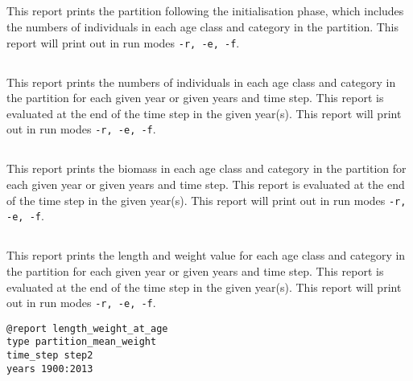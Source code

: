 \subsection{}\label{sec:Report-InitialisationPartition}

This report prints the partition following the initialisation phase, which includes the numbers of individuals in each age class and category in the partition. This report will print out in run modes \texttt{-r, -e, -f}.

\subsection{}\label{sec:Report-Partition}

This report prints the numbers of individuals in each age class and category in the partition for each given year or given years and time step. This report is evaluated at the end of the time step in the given year(s). This report will print out in run modes \texttt{-r, -e, -f}.

\subsection{}\label{sec:Report-PartitionBiomass}

This report prints the biomass in each age class and category in the partition for each given year or given years and time step. This report is evaluated at the end of the time step in the given year(s). This report will print out in run modes \texttt{-r, -e, -f}.
\ifAgeBased

\subsection{}\label{sec:Report-AgeLength}\label{sec:Report-LenthWeight}

This report prints the length and weight value for each age class and category in the partition for each given year or given years and time step. This report is evaluated at the end of the time step in the given year(s). This report will print out in run modes \texttt{-r, -e, -f}.

\begin{verbatim}
@report length_weight_at_age
type partition_mean_weight
time_step step2
years 1900:2013
\end{verbatim}

